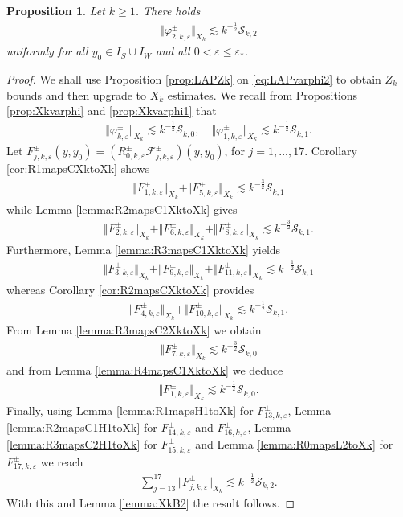 \documentclass[11pt,reqno]{amsproc}
\newtheorem{proposition}{Proposition}[section]
\theoremstyle{definition}
\numberwithin{equation}{section}
\newcommand{\F}{{\mathcal F}}
\newcommand{\cS}{{\mathcal S}}
\newcommand{\ep}{\varepsilon}
\begin{document}
\begin{proposition}\label{prop:Xkvarphi2}
Let $k\geq 1$. There holds
\begin{align*}
 \Vert \varphi_{2,k,\ep}^\pm\Vert_{X_k}\lesssim k^{-\frac12}\cS_{k,2}
\end{align*}
uniformly for all $y_0\in I_S\cup I_{W}$ and all $0 < \ep\leq \ep_*$.
\end{proposition}

\begin{proof}
We shall use Proposition \ref{prop:LAPZk} on \eqref{eq:LAPvarphi2} to obtain $Z_k$ bounds and then upgrade to $X_k$ estimates. We recall from Propositions \ref{prop:Xkvarphi} and \ref{prop:Xkvarphi1} that 
\begin{align*}
\Vert \varphi_{k,\ep}^\pm\Vert_{X_k}\lesssim k^{-\frac12}\cS_{k,0}, \quad \Vert \varphi_{1,k,\ep}^\pm\Vert_{X_k}\lesssim k^{-\frac12}\cS_{k,1}. 
\end{align*}
Let $F_{j,k,\ep}^\pm(y,y_0) = \left(R_{0,k,\ep}^\pm\F_{j,k,\ep}^\pm \right)(y,y_0)$, for $j=1,...,17$. Corollary \ref{cor:R1mapsCXktoXk} shows
\begin{align*}
\Vert F_{1,k,\ep}^\pm \Vert_{X_k} + \Vert F_{5,k,\ep}^\pm \Vert_{X_k} \lesssim k^{-\frac32}\cS_{k,1}
\end{align*}
while Lemma \ref{lemma:R2mapsC1XktoXk} gives
\begin{align*}
\Vert F_{2,k,\ep}^\pm \Vert_{X_k} + \Vert F_{6,k,\ep}^\pm \Vert_{X_k} + \Vert F_{8,k,\ep}^\pm \Vert_{X_k} \lesssim k^{-\frac32}\cS_{k,1}.
\end{align*}
Furthermore, Lemma \ref{lemma:R3mapsC1XktoXk} yields
\begin{align*}
\Vert F_{3,k,\ep}^\pm \Vert_{X_k} + \Vert F_{9,k,\ep}^\pm \Vert_{X_k} + \Vert F_{11,k,\ep}^\pm \Vert_{X_k} \lesssim k^{-\frac12}\cS_{k,1}
\end{align*}
whereas Corollary \ref{cor:R2mapsCXktoXk} provides
\begin{align*}
\Vert F_{4,k,\ep}^\pm \Vert_{X_k} + \Vert F_{10,k,\ep}^\pm \Vert_{X_k} \lesssim k^{-\frac12}\cS_{k,1}.
\end{align*}
From Lemma \ref{lemma:R3mapsC2XktoXk} we obtain
\begin{align*}
\Vert F_{7,k,\ep}^\pm \Vert_{X_k} \lesssim k^{-\frac32}\cS_{k,0}
\end{align*}
and from Lemma \ref{lemma:R4mapsC1XktoXk} we deduce
\begin{align*}
\Vert F_{1,k,\ep}^\pm \Vert_{X_k} \lesssim k^{-\frac12}\cS_{k,0}.
\end{align*}
Finally, using Lemma \ref{lemma:R1mapsH1toXk} for $F_{13,k,\ep}^\pm$, Lemma \ref{lemma:R2mapsC1H1toXk} for $F_{14,k,\ep}^\pm$ and $F_{16,k,\ep}^\pm$, Lemma \ref{lemma:R3mapsC2H1toXk} for $F_{15,k,\ep}^\pm$ and Lemma \ref{lemma:R0mapsL2toXk} for $F_{17,k,\ep}^\pm$ we reach
\begin{align*}
\sum_{j=13}^{17}\Vert F_{j,k,\ep}^\pm \Vert_{X_k} \lesssim k^{-\frac12}\cS_{k,2}.
\end{align*}
With this and Lemma \ref{lemma:XkB2} the result follows.
\end{proof}
\end{document}
